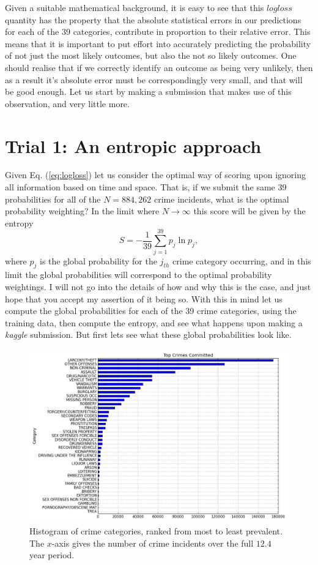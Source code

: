 \documentclass[12pt,notitlepage]{article}
\begin{document}
Given a suitable mathematical background, it is easy to see that this $logloss$ quantity has the property that the absolute statistical errors in our predictions for each of the 39 categories, contribute in proportion to their relative error. This means that it is important to put effort into accurately predicting the probability of not just the most likely outcomes, but also the not so likely outcomes. One should realise that if we correctly identify an outcome as being very unlikely, then as a result it's absolute error must be correspondingly very small, and that will be good enough. Let us start by making a submission that makes use of this observation, and very little more.

\section{Trial 1: An entropic approach}
Given Eq. (\ref{eq:logloss}) let us consider the optimal way of scoring upon ignoring all information based on time and space. That is, if we submit the same 39 probabilities for all of the $N=884,262$ crime incidents, what is the optimal probability weighting? In the limit where $N\rightarrow \infty$ this score will be given by the entropy
%
\begin{equation}
S = -\frac{1}{39}\sum_{j=1}^{39} p_j \ln{p_j},
\end{equation}
where $p_j$ is the global probability for the $j_{th}$ crime category occurring, and in this limit the global probabilities will correspond to the optimal probability weightings. I will not go into the details of how and why this is the case, and just hope that you accept my assertion of it being so. With this in mind let us compute the global probabilities for each of the 39 crime categories, using the training data, then compute the entropy, and see what happens upon making a \emph{kaggle} submission. But first lets see what these global probabilities look like.
%
\begin{figure}
\centering{}\includegraphics[scale=0.4]{crime-histo}\caption{ Histogram of crime categories, ranked from most to least prevalent. The $x$-axis gives the number of crime incidents over the full $12.4$ year period.  \label{fig:crime-hist}}
\end{figure}
\end{document}
